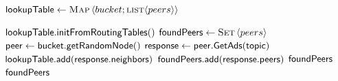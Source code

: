 \begin{algorithm}[]%
    \caption{%
        Lookup algorithm run by searchers.
    }%
    \label{alg:lookup}%
    \begin{algorithmic}[1]%
         \footnotesize
        \State $\mathsf{lookupTable} \gets  \textsc{Map}\left \langle bucket;\textsc{list}\langle peers \rangle \right \rangle$
        \item[]
            \State $\mathsf{lookupTable.initFromRoutingTables()}$
            \State $\mathsf{foundPeers} \gets  \textsc{Set}\left \langle peers\right \rangle$
                    \State $\mathsf{peer} \gets \mathsf{bucket.getRandomNode()}$
                    \State $\mathsf{response} \gets \mathsf{peer.GetAds(topic)}$
                    \State $\mathsf{lookupTable.add}(\mathsf{response.neighbors})$
                    \State $\mathsf{foundPeers.add}(\mathsf{response.peers})$
                        \State \Return $\mathsf{foundPeers}$
                    \EndIf
                \EndFor
            \EndFor
            \State \Return $\mathsf{foundPeers}$
        \EndProcedure
    \end{algorithmic}%
\end{algorithm}%


